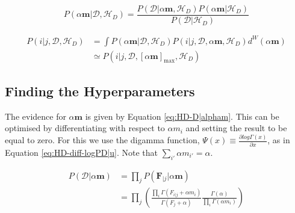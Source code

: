\begin{equation}
P(\alpha\boldsymbol{m}|\mathcal{D},\mathscr{H}_{D})=\frac{P(\mathcal{D}|\alpha\boldsymbol{m},\mathscr{H}_{D})P(\alpha\boldsymbol{m}|\mathscr{H}_{D})}{P(\mathcal{D}|\mathscr{H}_{D})}
\label{eq:HD-alpham|D-H}
\end{equation}

\begin{align}
P(i|j,\mathcal{D},\mathscr{H}_{D})&=\int P(\alpha\boldsymbol{m}|\mathcal{D},\mathscr{H}_{D})P(i|j,\mathcal{D},\alpha\boldsymbol{m},\mathscr{H}_{D})d^{W}(\alpha\boldsymbol{m}) \nonumber
\\
&\simeq P(i|j,\mathcal{D},[\alpha\boldsymbol{m}]_{\text{max}},\mathscr{H}_{D})
\label{eq:HD-i|j-D-H}
\end{align}

\subsection{Finding the Hyperparameters}

The evidence for $\alpha\boldsymbol{m}$ is given by Equation \ref{eq:HD-D|alpham}. This can be optimised by differentiating with respect to $\alpha m_{i}$ and setting the result to be equal to zero. For this we use the digamma function, $\Psi(x)\equiv\frac{\partial log\Gamma(x)}{\partial x}$, as in Equation \ref{eq:HD-diff-logPD|u}. Note that $\sum_{i'}\alpha m_{i'}=\alpha$.

\begin{align}
P(\mathcal{D}|\alpha\boldsymbol{m})&=\prod_{j}P(\boldsymbol{F}_{|j}|\alpha\boldsymbol{m}) \nonumber
\\
&=\prod_{j}\left(\frac{\prod_{i}\Gamma(F_{i|j}+\alpha m_{i})}{\Gamma(F_{j}+\alpha)}\frac{\Gamma(\alpha)}{\prod_{i}\Gamma(\alpha m_{i})}\right)
\label{eq:HD-D|alpham}
\end{align}

